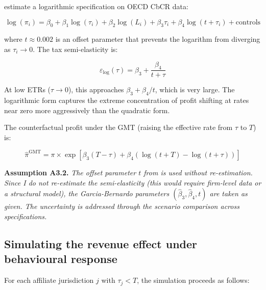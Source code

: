 \documentclass[11pt,a4paper]{article}
\newcommand{\assumption}[2]{\noindent\textbf{Assumption #1.} \textit{#2}\medskip}
\begin{document}
\citet{garcia2024} estimate a logarithmic specification on OECD CbCR data:

\begin{equation}\label{eq:garcia_spec}
\log(\pi_i) = \beta_0 + \beta_1 \log(\tau_i) + \beta_2 \log(L_i) + \beta_3 \tau_i + \beta_4 \log(t + \tau_i) + \text{controls}
\end{equation}

where $t \approx 0.002$ is an offset parameter that prevents the logarithm from diverging as $\tau_i \to 0$. The tax semi-elasticity is:

\begin{equation}\label{eq:garcia_se}
\varepsilon_{\log}(\tau) = \beta_3 + \frac{\beta_4}{t + \tau}
\end{equation}

At low ETRs ($\tau \to 0$), this approaches $\beta_3 + \beta_4/t$, which is very large. The logarithmic form captures the extreme concentration of profit shifting at rates near zero more aggressively than the quadratic form.

The counterfactual profit under the GMT (raising the effective rate from $\tau$ to $T$) is:

\begin{equation}\label{eq:garcia_response}
\hat{\pi}^{\text{GMT}} = \pi \times \exp\!\left[\beta_3(T - \tau) + \beta_4\left(\log(t + T) - \log(t + \tau)\right)\right]
\end{equation}

\assumption{A3.2}{The offset parameter $t$ from \citet{garcia2024} is used without re-estimation. Since I do not re-estimate the semi-elasticity (this would require firm-level data or a structural model), the Garcia-Bernardo parameters $(\hat{\beta}_3, \hat{\beta}_4, t)$ are taken as given. The uncertainty is addressed through the scenario comparison across specifications.}

\subsection{Simulating the revenue effect under behavioural response}\label{sec:behav_sim}

For each affiliate jurisdiction $j$ with $\tau_j < T$, the simulation proceeds as follows:
\end{document}
